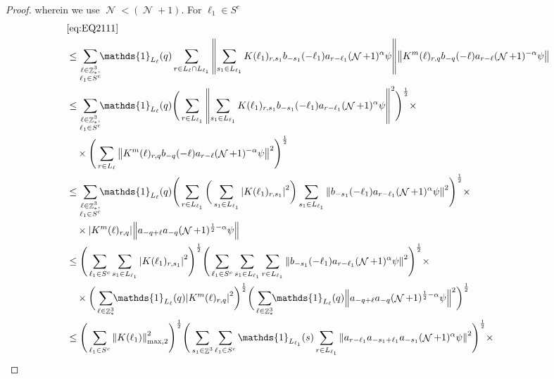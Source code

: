\documentclass[12pt,a4paper]{article}
\numberwithin{equation}{section}
\newcommand{\1}{\mathbb{I}}
\DeclareMathOperator{\Z}{\mathbb{Z}}
\DeclareMathOperator{\NN}{\mathcal{N}}
\newcommand{\half}{\frac{1}{2}}
\newcommand{\normmaxii}[1]{\norm{#1}_{\mathrm{max,2}}}
\theoremstyle{plain}
\theoremstyle{definition}
\theoremstyle{remark}
\theoremstyle{plain}
\theoremstyle{definition}
\theoremstyle{remark}
\begin{document}
\begin{proof}
	wherein we use $\NN<(\NN+1)$. For $\ell_1 \in S^c$
	\begin{align}
		&\eqref{eq:EQ2111}\nonumber\\
		&\leq\sum\limits_{\substack{\ell \in \Z^3_*,\\\ell_1 \in S^c}} \!\!\mathds{1}_{L_\ell}(q) \sum\limits_{ r \in L_\ell \cap L_{\ell_1}}    \norm{ \sum\limits_{s_1 \in L_{\ell_1}} K(\ell_1)_{r,s_1} b_{-s_1}(-\ell_1)  a_{r-\ell_1} (\NN+1)^{\alpha}\psi}\norm{ K^{m}(\ell)_{r,q}   b_{-q}(-\ell) a_{r-\ell} (\NN+1)^{-\alpha}\psi } \nonumber\\
		&\leq \sum\limits_{\substack{\ell \in \Z^3_*,\\\ell_1 \in S^c}} \!\!\mathds{1}_{L_\ell}(q) \Bigg( \sum\limits_{r \in L_{\ell_1}} \norm{\sum\limits_{s_1 \in L_{\ell_1}} K(\ell_1)_{r,s_1} b_{-s_1}(-\ell_1) a_{r-\ell_1} (\NN+1)^{\alpha}\psi}^2\Bigg)^\half \times\nonumber\\
		&\quad \times \Bigg( \sum\limits_{r \in L_\ell}  \norm{  K^{m}(\ell)_{r,q}  b_{-q}(-\ell) a_{r-\ell} (\NN+1)^{-\alpha}\psi }^2\Bigg)^\half \nonumber\\
		&\leq \sum\limits_{\substack{\ell \in \Z^3_*,\\ \ell_1 \in S^c}} \!\!\mathds{1}_{L_\ell}(q) \Bigg( \sum\limits_{r \in L_{\ell_1}} \bigg( \sum\limits_{s_1 \in L_{\ell_1}}\abs{K(\ell_1)_{r,s_1}}^2\bigg) \sum\limits_{s_1 \in L_{\ell_1}} \norm{ b_{-s_1}(-\ell_1)  a_{r-\ell_1} (\NN+1)^{\alpha}\psi}^2\Bigg)^\half \times\nonumber\\
		&\quad \times  \abs{  K^{m}(\ell)_{r,q}} \norm{a_{-q+\ell}a_{-q} (\NN+1)^{\half-\alpha}\psi } \nonumber\\
		&\leq  \Bigg( \sum\limits_{ \ell_1 \in S^c}  \sum\limits_{s_1 \in L_{\ell_1}}\abs{K(\ell_1)_{r,s_1}}^2\Bigg)^\half \Bigg(\sum\limits_{ \ell_1 \in S^c}  \sum\limits_{s_1 \in L_{\ell_1}} \sum\limits_{r \in L_{\ell_1}}\norm{ b_{-s_1}(-\ell_1)  a_{r-\ell_1} (\NN+1)^{\alpha}\psi}^2\Bigg)^\half \times\nonumber\\
		&\quad \times  \bigg(\sum\limits_{\ell \in \Z^3_*} \!\!\mathds{1}_{L_\ell}(q)\abs{  K^{m}(\ell)_{r,q}}^2\bigg)^\half \bigg(\sum\limits_{\ell \in \Z^3_*} \!\!\mathds{1}_{L_\ell}(q)\norm{a_{-q+\ell}a_{-q} (\NN+1)^{\half-\alpha}\psi }^2\bigg)^\half \nonumber\\
		&\leq\Bigg( \sum\limits_{ \ell_1 \in S^c}    \normmaxii{K(\ell_1)}^2\Bigg)^\half \Bigg(  \sum\limits_{s_1 \in \Z^3} \sum\limits_{ \ell_1 \in S^c} \mathds{1}_{L_{\ell_1}}(s) \sum\limits_{r \in L_{\ell_1}} \norm{ a_{r-\ell_1} a_{-s_1+\ell_1}a_{-s_1}   (\NN+1)^{\alpha}\psi}^2\Bigg)^\half \times\nonumber\\

\end{align}
\end{proof}
\end{document}
